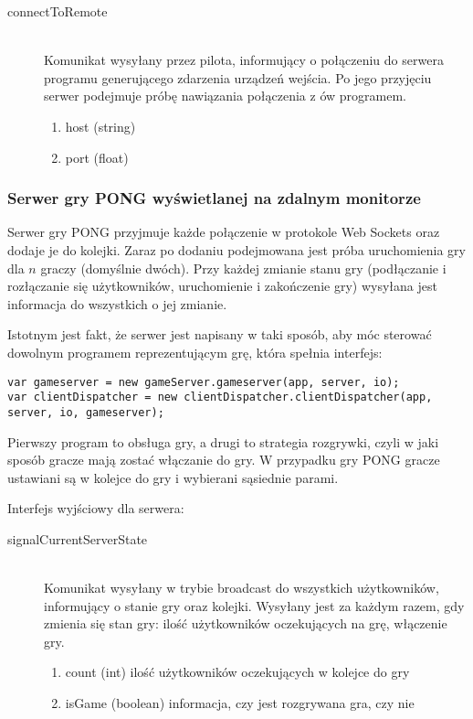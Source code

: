 \begin{description}
	\item[connectToRemote] \hfill \\
	Komunikat wysyłany przez pilota, informujący o połączeniu do serwera programu generującego zdarzenia urządzeń wejścia. Po jego przyjęciu serwer podejmuje próbę nawiązania połączenia z ów programem.
	\begin{enumerate}
		\item host (string)
		\item port (float)
	\end{enumerate}
\end{description}


\subsubsection{Serwer gry PONG wyświetlanej na zdalnym monitorze}

Serwer gry PONG przyjmuje każde połączenie w protokole Web Sockets oraz dodaje je do kolejki. Zaraz po dodaniu podejmowana jest próba uruchomienia gry dla \(n\) graczy (domyślnie dwóch). Przy każdej zmianie stanu gry (podłączanie i rozłączanie się użytkowników, uruchomienie i zakończenie gry) wysyłana jest informacja do wszystkich o jej zmianie.

Istotnym jest fakt, że serwer jest napisany w taki sposób, aby móc sterować dowolnym programem reprezentującym grę, która spełnia interfejs:

\lstset{language=JavaScript}
\begin{lstlisting}
var gameserver = new gameServer.gameserver(app, server, io);
var clientDispatcher = new clientDispatcher.clientDispatcher(app, server, io, gameserver);
\end{lstlisting}

Pierwszy program to obsługa gry, a drugi to strategia rozgrywki, czyli w jaki sposób gracze mają zostać włączanie do gry. W przypadku gry PONG gracze ustawiani są w kolejce do gry i wybierani sąsiednie parami.

Interfejs wyjściowy dla serwera:

\begin{description}
	\item[signalCurrentServerState] \hfill \\
	Komunikat wysyłany w trybie broadcast do wszystkich użytkowników, informujący o stanie gry oraz kolejki. Wysyłany jest za każdym razem, gdy zmienia się stan gry: ilość użytkowników oczekujących na grę, włączenie gry.
	\begin{enumerate}
		\item count (int) ilość użytkowników oczekujących w kolejce do gry
		\item isGame (boolean) informacja, czy jest rozgrywana gra, czy nie
	\end{enumerate}
\end{description}

